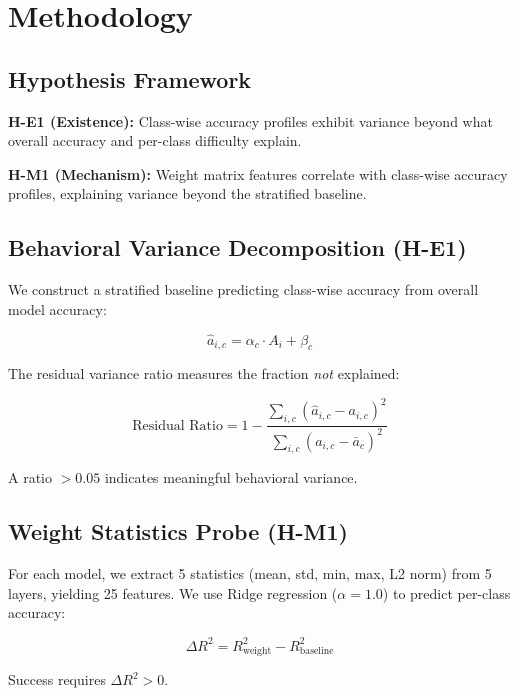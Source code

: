 \section{Methodology}

\subsection{Hypothesis Framework}

\textbf{H-E1 (Existence):} Class-wise accuracy profiles exhibit variance beyond what overall accuracy and per-class difficulty explain.

\textbf{H-M1 (Mechanism):} Weight matrix features correlate with class-wise accuracy profiles, explaining variance beyond the stratified baseline.

\subsection{Behavioral Variance Decomposition (H-E1)}

We construct a stratified baseline predicting class-wise accuracy from overall model accuracy:

\begin{equation}
\hat{a}_{i,c} = \alpha_c \cdot A_i + \beta_c
\end{equation}

The residual variance ratio measures the fraction \emph{not} explained:

\begin{equation}
\text{Residual Ratio} = 1 - \frac{\sum_{i,c}(\hat{a}_{i,c} - a_{i,c})^2}{\sum_{i,c}(a_{i,c} - \bar{a}_c)^2}
\end{equation}

A ratio $> 0.05$ indicates meaningful behavioral variance.

\subsection{Weight Statistics Probe (H-M1)}

For each model, we extract 5 statistics (mean, std, min, max, L2 norm) from 5 layers, yielding 25 features. We use Ridge regression ($\alpha = 1.0$) to predict per-class accuracy:

\begin{equation}
\Delta R^2 = R^2_{\text{weight}} - R^2_{\text{baseline}}
\end{equation}

Success requires $\Delta R^2 > 0$.
